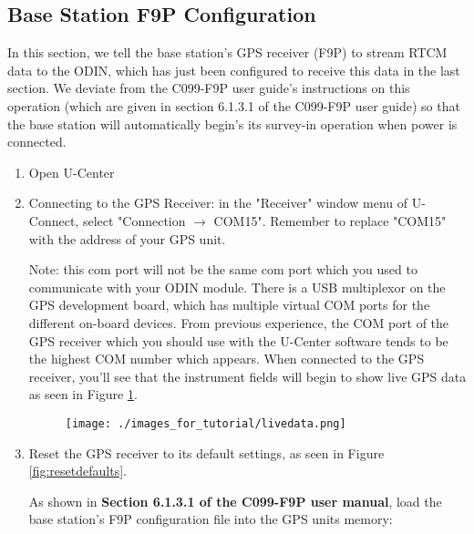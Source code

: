 \documentclass{article}%
\begin{document}
\subsection{Base Station F9P Configuration}\label{ref:bs_f9p_config}
	In this section, we tell the base station's GPS receiver (F9P) to stream RTCM data to the ODIN, which has just been configured to receive this data in the last section.  We deviate from the C099-F9P user guide's instructions on this operation (which are given in section 6.1.3.1 of the C099-F9P user guide) so that the base station will automatically begin's its survey-in operation when power is connected.
	
	\begin{enumerate}
	\item Open U-Center
	\item Connecting to the GPS Receiver: in the "Receiver" window menu of U-Connect, select "Connection $\rightarrow$ COM15".  Remember to replace "COM15" with the address of your GPS unit.
	
	\begin{myquote} Note: this com port will not be the same com port which you used to communicate with your ODIN module. There is a USB multiplexor on the GPS development board, which has multiple virtual COM ports for the different on-board devices.  From previous experience, the COM port of the GPS receiver which you should use with the U-Center software tends to be the highest COM number which appears.  When connected to the GPS receiver, you'll see that the instrument fields will begin to show live GPS data as seen in Figure \ref{fig:livedata}.
	\end{myquote}
	
	\begin{figure}
		\centering
		\texttt{[image: ./images\_for\_tutorial/livedata.png]}
		\label{fig:livedata}
	\end{figure}
	
	\item Reset the GPS receiver to its default settings, as seen in Figure \ref{fig:resetdefaults}.
	
	As shown in \textbf{Section 6.1.3.1 of the C099-F9P user manual}, load the base station's F9P configuration file into the GPS units memory:
	
	\begin{enumerate}
	

\end{enumerate}
\end{enumerate}
\end{document}
